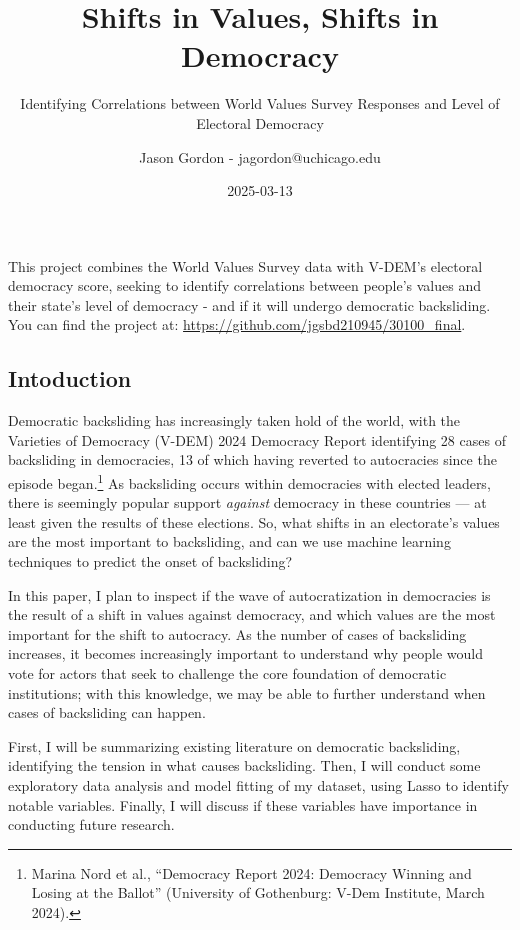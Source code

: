 \documentclass[
  letterpaper,
  DIV=11,
  numbers=noendperiod]{scrartcl}
\title{Shifts in Values, Shifts in Democracy}
\subtitle{Identifying Correlations between World Values Survey Responses
and Level of Electoral Democracy}
\author{Jason Gordon - jagordon@uchicago.edu}
\date{2025-03-13}
\begin{document}
\maketitle


This project combines the World Values Survey data with V-DEM's
electoral democracy score, seeking to identify correlations between
people's values and their state's level of democracy - and if it will
undergo democratic backsliding. You can find the project at:
\url{https://github.com/jgsbd210945/30100_final}.

\newpage

\subsection{Intoduction}\label{intoduction}

Democratic backsliding has increasingly taken hold of the world, with
the Varieties of Democracy (V-DEM) 2024 Democracy Report identifying 28
cases of backsliding in democracies, 13 of which having reverted to
autocracies since the episode began.\footnote{Marina Nord et al.,
  {``Democracy {Report} 2024: {Democracy Winning} and {Losing} at the
  {Ballot}''} (University of Gothenburg: V-Dem Institute, March 2024).}
As backsliding occurs within democracies with elected leaders, there is
seemingly popular support \emph{against} democracy in these countries
--- at least given the results of these elections. So, what shifts in an
electorate's values are the most important to backsliding, and can we
use machine learning techniques to predict the onset of backsliding?

In this paper, I plan to inspect if the wave of autocratization in
democracies is the result of a shift in values against democracy, and
which values are the most important for the shift to autocracy. As the
number of cases of backsliding increases, it becomes increasingly
important to understand why people would vote for actors that seek to
challenge the core foundation of democratic institutions; with this
knowledge, we may be able to further understand when cases of
backsliding can happen.

First, I will be summarizing existing literature on democratic
backsliding, identifying the tension in what causes backsliding. Then, I
will conduct some exploratory data analysis and model fitting of my
dataset, using Lasso to identify notable variables. Finally, I will
discuss if these variables have importance in conducting future
research.
\end{document}
